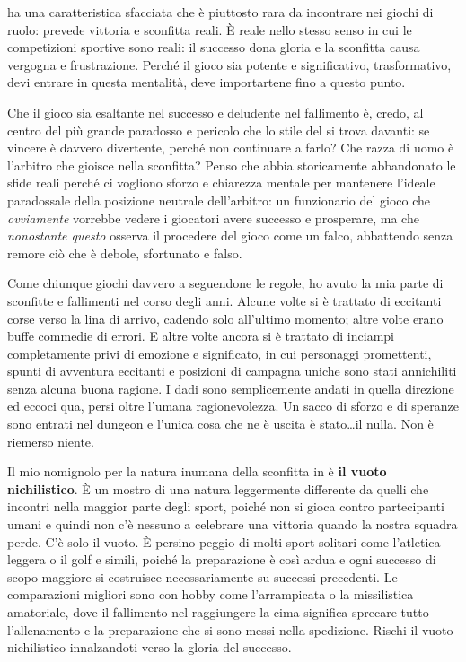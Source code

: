 
\dnd{}  ha una caratteristica sfacciata che è piuttosto rara da incontrare nei giochi di ruolo: prevede vittoria e sconfitta reali. È reale nello stesso senso in cui le competizioni sportive sono reali: il successo dona gloria e la sconfitta causa vergogna e frustrazione. Perché il gioco sia potente e significativo, trasformativo, devi entrare in questa mentalità, deve importartene fino a questo punto.

Che il gioco sia esaltante nel successo e deludente nel fallimento è, credo, al centro del più grande paradosso e pericolo che lo stile del  si trova davanti: se vincere è davvero divertente, perché non continuare a farlo? Che razza di uomo è l'arbitro che gioisce nella sconfitta? Penso che \dnd{} abbia storicamente abbandonato le sfide reali perché ci vogliono sforzo e chiarezza mentale per mantenere l'ideale paradossale della posizione neutrale dell'arbitro: un funzionario del gioco che \textit{ovviamente} vorrebbe vedere i giocatori avere successo e prosperare, ma che \textit{nonostante questo} osserva il procedere del gioco come un falco, abbattendo senza remore ciò che è debole, sfortunato e falso.


Come chiunque giochi davvero a \dnd{} seguendone le regole, ho avuto la mia parte di sconfitte e fallimenti nel corso degli anni. Alcune volte si è trattato di eccitanti corse verso la lina di arrivo, cadendo solo all'ultimo momento; altre volte erano buffe commedie di errori. E altre volte ancora si è trattato di inciampi completamente privi di emozione e significato, in cui personaggi promettenti, spunti di avventura eccitanti e posizioni di campagna uniche sono stati annichiliti senza alcuna buona ragione. I dadi sono semplicemente andati in quella direzione ed eccoci qua, persi oltre l'umana ragionevolezza. Un sacco di sforzo e di speranze sono entrati nel dungeon e l'unica cosa che ne è uscita è stato\dots il nulla. Non è riemerso niente.

Il mio nomignolo per la natura inumana della sconfitta in \dnd{} è \textbf{il vuoto nichilistico}. È un mostro di una natura leggermente differente da quelli che incontri nella maggior parte degli sport, poiché \dnd{} non si gioca contro partecipanti umani e quindi non c'è nessuno a celebrare una vittoria quando la nostra squadra perde. C'è solo il vuoto. È persino peggio di molti sport solitari come l'atletica leggera o il golf e simili, poiché la preparazione è così ardua e ogni successo di scopo maggiore si costruisce necessariamente su successi precedenti. Le comparazioni migliori sono con hobby come l'arrampicata o la missilistica amatoriale, dove il fallimento nel raggiungere la cima significa sprecare tutto l'allenamento e la preparazione che si sono messi nella spedizione. Rischi il vuoto nichilistico innalzandoti verso la gloria del successo.

